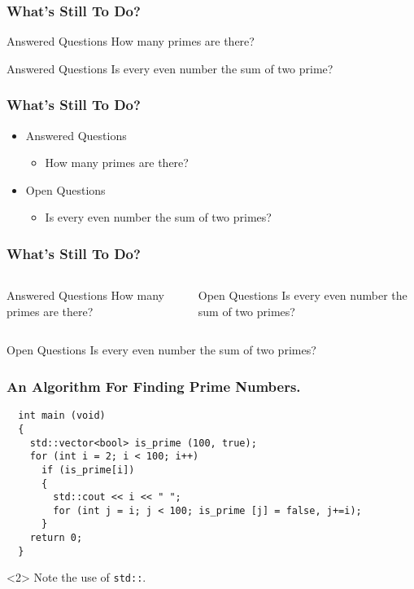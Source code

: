 \documentclass[handout]{beamer}
\begin{document}
\begin{frame}
  \frametitle{What's Still To Do?}

  \begin{block}{Answered Questions}
    How many primes are there?
  \end{block}

  \begin{block}{Answered Questions}
    Is every even number the sum of two prime?
  \end{block}
\end{frame}

\begin{frame}
  \frametitle{What’s Still To Do?}
  \begin{itemize}
    \item Answered Questions
          \begin{itemize}
            \item How many primes are there?
          \end{itemize}

    \item Open Questions
          \begin{itemize}
            \item Is every even number the sum of two primes?
          \end{itemize}
  \end{itemize}
\end{frame}

\begin{frame}
  \frametitle{What’s Still To Do?}
  \begin{columns}[t]
    \begin{block}{Answered Questions}
      How many primes are there?
    \end{block}

    \begin{block}{Open Questions}
      Is every even number the sum of two primes?
    \end{block}
  \end{columns}
\end{frame}

\begin{frame}
  \begin{block}{Open Questions}
    Is every even number the sum of two primes?\cite{Goldbach1742}
  \end{block}
\end{frame}

\begin{frame}[fragile]
  \frametitle{An Algorithm For Finding Prime Numbers.}
  \begin{verbatim}
  int main (void)
  {
    std::vector<bool> is_prime (100, true);
    for (int i = 2; i < 100; i++)
      if (is_prime[i])
      {
        std::cout << i << " ";
        for (int j = i; j < 100; is_prime [j] = false, j+=i);
      }
    return 0;
  }
  \end{verbatim}
  \begin{uncoverenv}<2>
    Note the use of \verb|std::|.
  \end{uncoverenv}
\end{frame}
\end{document}
